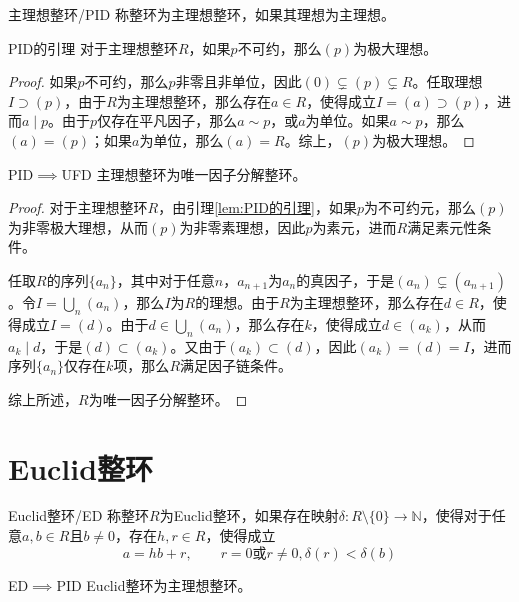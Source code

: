 \documentclass[lang = cn, scheme = chinese, thmcnt = section]{elegantbook}
\newcommand{\N}{\mathbb{N}}            %
\begin{document}
\begin{definition}{主理想整环/PID}
	称整环为主理想整环，如果其理想为主理想。
\end{definition}

\begin{lemma}{}{PID的引理}
	对于主理想整环$R$，如果$p$不可约，那么$(p)$为极大理想。
\end{lemma}

\begin{proof}
	如果$p$不可约，那么$p$非零且非单位，因此$(0)\subsetneq (p) \subsetneq R$。任取理想$I\supset (p)$，由于$R$为主理想整环，那么存在$a\in R$，使得成立$I=(a)\supset (p)$，进而$a\mid p$。由于$p$仅存在平凡因子，那么$a\sim p$，或$a$为单位。如果$a\sim p$，那么$(a)=(p)$；如果$a$为单位，那么$(a)=R$。综上，$(p)$为极大理想。
\end{proof}

\begin{definition}{PID$\implies$UFD}
	主理想整环为唯一因子分解整环。
\end{definition}

\begin{proof}
	对于主理想整环$R$，由引理\ref{lem:PID的引理}，如果$p$为不可约元，那么$(p)$为非零极大理想，从而$(p)$为非零素理想，因此$p$为素元，进而$R$满足素元性条件。
	
	任取$R$的序列$\{a_n\}$，其中对于任意$n$，$a_{n+1}$为$a_n$的真因子，于是$(a_{n})\subsetneq (a_{n+1})$。令$\displaystyle I=\bigcup_{n}(a_n)$，那么$I$为$R$的理想。由于$R$为主理想整环，那么存在$d\in R$，使得成立$I=(d)$。由于$\displaystyle d\in\bigcup_{n}(a_n)$，那么存在$k$，使得成立$d\in (a_k)$，从而$a_k\mid d$，于是$(d)\subset (a_k)$。又由于$(a_k)\subset (d)$，因此$(a_k)=(d)=I$，进而序列$\{a_n\}$仅存在$k$项，那么$R$满足因子链条件。
	
	综上所述，$R$为唯一因子分解整环。
\end{proof}

\section{Euclid整环}

\begin{definition}{Euclid整环/ED}
	称整环$R$为Euclid整环，如果存在映射$\delta:R\setminus\{0\}\to \N$，使得对于任意$a,b\in R$且$b\ne 0$，存在$h,r\in R$，使得成立
	$$
	a=hb+r,\qquad r=0\text{或}r\ne 0,\delta(r)<\delta(b)
	$$
\end{definition}

\begin{definition}{ED$\implies$PID}
	Euclid整环为主理想整环。
\end{definition}
\end{document}
